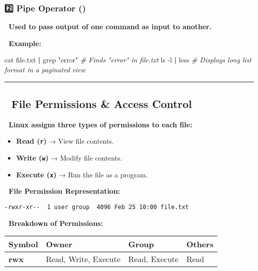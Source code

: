 \documentclass[
]{article}
\newenvironment{Shaded}{}{}
\newcommand{\AttributeTok}[1]{\textcolor[rgb]{0.49,0.56,0.16}{#1}}
\newcommand{\CommentTok}[1]{\textcolor[rgb]{0.38,0.63,0.69}{\textit{#1}}}
\newcommand{\FunctionTok}[1]{\textcolor[rgb]{0.02,0.16,0.49}{#1}}
\newcommand{\KeywordTok}[1]{\textcolor[rgb]{0.00,0.44,0.13}{\textbf{#1}}}
\newcommand{\NormalTok}[1]{#1}
\newcommand{\StringTok}[1]{\textcolor[rgb]{0.25,0.44,0.63}{#1}}
\providecommand{\tightlist}{%
  \setlength{\itemsep}{0pt}\setlength{\parskip}{0pt}}
\begin{document}
\subsubsection{\texorpdfstring{\textbf{2️⃣ Pipe Operator
(\texttt{\textbar{}})}}{2️⃣ Pipe Operator (\textbar)}}\label{pipe-operator}

📌 \textbf{Used to pass output of one command as input to another.}

📌 \textbf{Example:}

\begin{Shaded}
\begin{Highlighting}[]
\FunctionTok{cat}\NormalTok{ file.txt }\KeywordTok{|} \FunctionTok{grep} \StringTok{"error"}  \CommentTok{\# Finds "error" in file.txt}
\FunctionTok{ls} \AttributeTok{{-}l} \KeywordTok{|} \FunctionTok{less}  \CommentTok{\# Displays long list format in a paginated view}
\end{Highlighting}
\end{Shaded}

\begin{center}\rule{0.5\linewidth}{0.5pt}\end{center}

\subsection{\texorpdfstring{\textbf{📌 File Permissions \& Access
Control}}{📌 File Permissions \& Access Control}}\label{file-permissions-access-control}

📌 \textbf{Linux assigns three types of permissions to each file:}

\begin{itemize}
\tightlist
\item
  \textbf{Read (\texttt{r})} → View file contents.
\item
  \textbf{Write (\texttt{w})} → Modify file contents.
\item
  \textbf{Execute (\texttt{x})} → Run the file as a program.
\end{itemize}

📌 \textbf{File Permission Representation:}

\begin{verbatim}
-rwxr-xr--  1 user group  4096 Feb 25 10:00 file.txt
\end{verbatim}

📌 \textbf{Breakdown of Permissions:}

\begin{longtable}[]{@{}llll@{}}
\toprule\noalign{}
\textbf{Symbol} & \textbf{Owner} & \textbf{Group} & \textbf{Others} \\
\midrule\noalign{}
\endhead
\bottomrule\noalign{}
\endlastfoot
\textbf{rwx} & Read, Write, Execute & Read, Execute & Read \\
\end{longtable}
\end{document}
